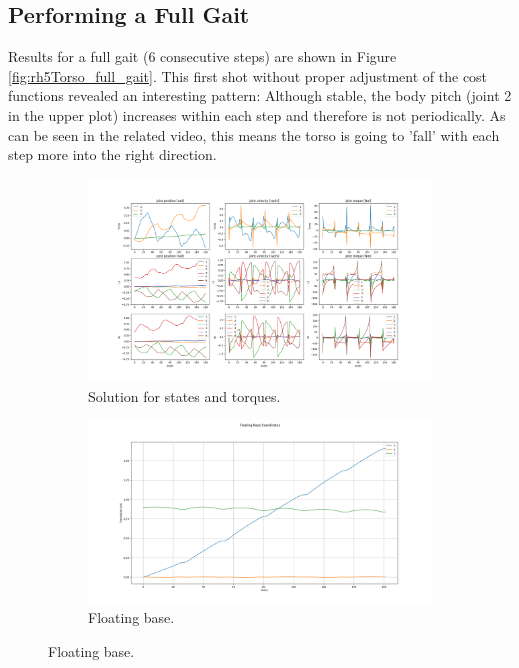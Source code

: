 \subsection{Performing a Full Gait}
Results for a full gait (6 consecutive steps) are shown in Figure \ref{fig:rh5Torso_full_gait}. This first shot without proper adjustment of the cost functions revealed an interesting pattern: Although stable, the body pitch (joint 2 in the upper plot) increases within each step and therefore is not periodically. As can be seen in the related video, this means the torso is going to 'fall' with each step more into the right direction. 
\begin{figure}[h!]
\begin{subfigure}{.5\textwidth}
 	 \centering
	 \includegraphics[width=1\linewidth]{Media/Crocoddyl/RH5Torso/RH5TorsoGait_Solution.png}
 	 \caption{Solution for states and torques.}
\end{subfigure}
\hfill
\begin{subfigure}{.5\textwidth}
  	\centering
  	\includegraphics[width=1\linewidth]{Media/Crocoddyl/RH5Torso/RH5TorsoGait_BaseCoord.png}
  	\caption{Floating base.}

\end{subfigure}
\end{figure}
